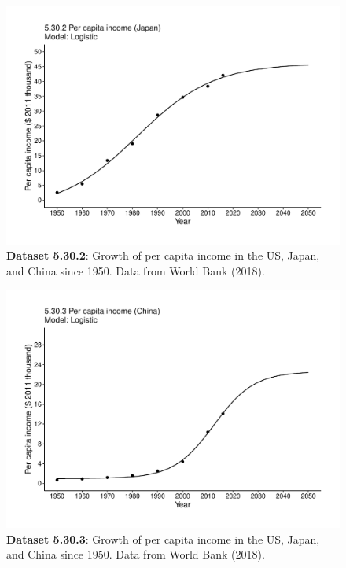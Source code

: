 \documentclass[aps,rmp,preprint,superscriptaddress,10pt,onecolumn]{article}
\begin{document}
\clearpage
\begin{figure}[h]
\includegraphics[width=\textwidth]{output/figs-ggplot/5.30.2.pdf}
\caption{\textbf{Dataset 5.30.2}: Growth of per capita income in the US, Japan, and China since 1950. Data from World Bank (2018).}
\end{figure}
	
\clearpage
\begin{figure}[h]
\includegraphics[width=\textwidth]{output/figs-ggplot/5.30.3.pdf}
\caption{\textbf{Dataset 5.30.3}: Growth of per capita income in the US, Japan, and China since 1950. Data from World Bank (2018).}
\end{figure}
	
\end{document}

